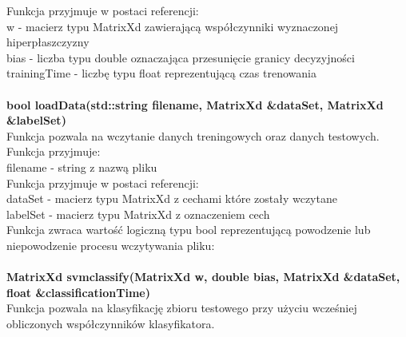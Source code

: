 \documentclass[[10pt,a4paper]{article}
\begin{document}
\vspace{3mm}Funkcja przyjmuje w postaci referencji:\\
w - macierz typu MatrixXd zawierającą współczynniki wyznaczonej hiperpłaszczyzny\\
bias - liczba typu double oznaczająca przesunięcie granicy decyzyjności\\
trainingTime - liczbę typu float reprezentującą czas trenowania\\
\newline
\newline
\newline
{}\\
\newline
\textbf {bool loadData(std::string filename, MatrixXd \&dataSet, MatrixXd \&labelSet)}\\
\newline
\vspace{3mm}Funkcja pozwala na wczytanie danych treningowych oraz danych testowych.\\
\vspace{3mm}Funkcja przyjmuje:\\
filename - string z nazwą pliku\\
\newline
\vspace{3mm}Funkcja przyjmuje w postaci referencji:\\
dataSet - macierz typu MatrixXd z cechami które zostały wczytane\\
labelSet - macierz typu MatrixXd z oznaczeniem cech\\
\newline
\vspace{3mm}Funkcja zwraca wartość logiczną typu bool reprezentującą powodzenie lub niepowodzenie procesu wczytywania pliku:\\
\newline
\newline
\newline
{}\\
\newline
\textbf {MatrixXd svmclassify(MatrixXd w, double bias, MatrixXd \&dataSet, float \&classificationTime)}\\
\newline
\vspace{3mm}Funkcja pozwala na klasyfikację zbioru testowego przy użyciu wcześniej obliczonych współczynników klasyfikatora.\\
\newline
\end{document}
